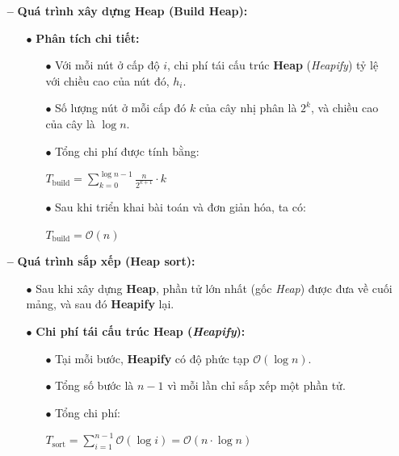 \begin{itemize}
    \item [\textbf{--}] \textbf{Quá trình xây dựng Heap (Build Heap):}
    \begin{itemize}
        \item [$\bullet$] \textbf{Phân tích chi tiết:}
        \begin{itemize}
            \item [$\bullet$] Với mỗi nút ở cấp độ $i$, chi phí tái cấu trúc \textbf{Heap} (\textit{Heapify}) tỷ lệ với chiều cao của nút đó, $h_i$.
            \item [$\bullet$] Số lượng nút ở mỗi cấp đó $k$ của cây nhị phân là $2^k$, và chiều cao của cây là $\log n$.
            \item [$\bullet$] Tổng chi phí được tính bằng:
            \begin{center}
                $T_{\text{build}} = \sum_{k=0}^{\log n - 1} \frac{n}{2^{k+1}} \cdot k$
            \end{center}
            \item [$\bullet$] Sau khi triển khai bài toán và đơn giản hóa, ta có:
            \begin{center}
                $T_{\text{build}} = \mathcal{O}(n)$
            \end{center}
        \end{itemize}
    \end{itemize}
    \item [\textbf{--}] \textbf{Quá trình sắp xếp (Heap sort):}
    \begin{itemize}
        \item [$\bullet$] Sau khi xây dựng \textbf{Heap}, phần tử lớn nhất (gốc \textit{Heap}) được đưa về cuối mảng, và sau đó \textbf{Heapify} lại.
        \item [$\bullet$] \textbf{Chi phí tái cấu trúc Heap (\textit{Heapify}):}
        \begin{itemize}
            \item [$\bullet$] Tại mỗi bước, \textbf{Heapify} có độ phức tạp $\mathcal{O}(\log n)$.
            \item [$\bullet$] Tổng số bước là $n-1$ vì mỗi lần chỉ sắp xếp một phần tử.
            \item [$\bullet$] Tổng chi phí:
            \begin{center}
                $T_{\text{sort}} = \sum_{i=1}^{n-1} \mathcal{O}(\log i) = \mathcal{O}(n \cdot \log n)$
            \end{center}

\end{itemize}
\end{itemize}
\end{itemize}
